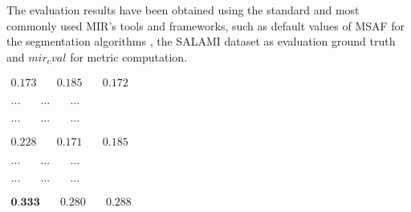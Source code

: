 
The evaluation results have been obtained using the standard and most commonly used MIR's tools and frameworks, such as default values of MSAF \cite{MSAF} for the segmentation algorithms \cite{sf}, the SALAMI dataset \cite{Smith2011DESIGNANNOTATIONS} as evaluation ground truth and $mir_eval$ \cite{RaffelMir_eval:METRICS} for metric computation.


\newsavebox\mfccSF
\begin{lrbox}{\mfccSF}
\centering
   $\begin{aligned}
     0.173 & \quad 0.185 & \quad 0.172 %
    \end{aligned} $
\end{lrbox}

\newsavebox\mfccFoote
\begin{lrbox}{\mfccFoote}
\centering
   $\begin{aligned}
     ... & \quad ... & \quad ... %
    \end{aligned} $
\end{lrbox}

\newsavebox\mfccCNMF
\begin{lrbox}{\mfccCNMF}
\centering
   $\begin{aligned}
     ... & \quad ... & \quad ... %
    \end{aligned} $
\end{lrbox}

\newsavebox\embeddioaSF
\begin{lrbox}{\embeddioaSF}
   $\begin{aligned}
     0.228 & \quad 0.171 & \quad 0.185
    \end{aligned} $
\end{lrbox}

\newsavebox\embeddioaFoote
\begin{lrbox}{\embeddioaFoote}
   $\begin{aligned}
     ... & \quad ... & \quad ...
    \end{aligned} $
\end{lrbox}

\newsavebox\embeddioaCNMF
\begin{lrbox}{\embeddioaCNMF}
   $\begin{aligned}
     ... & \quad ... & \quad ...
    \end{aligned} $
\end{lrbox}

\newsavebox\embeddiobSF
\begin{lrbox}{\embeddiobSF}
   $\begin{aligned}
     \textbf{0.333} & \quad 0.280 & \quad 0.288
    \end{aligned} $
\end{lrbox}


